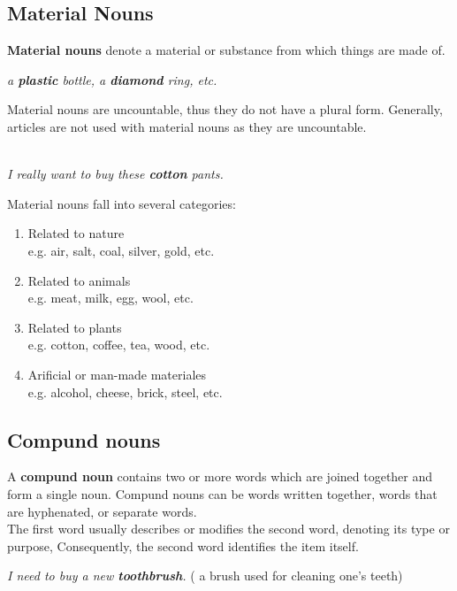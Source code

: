 \documentclass[hidelinks,10pt,a4paper]{article}
\begin{document}
\subsection{Material Nouns}
\textbf{Material nouns} denote a material or substance from which things are made of.
\begin{center}
		\textit{		a \textbf{plastic} bottle, a \textbf{diamond} ring, etc.}
\end{center}
Material nouns are uncountable, thus they do not have a plural form. Generally, articles are not used with material nouns as they are uncountable.
\begin{center}
\textit{
		\\
I really want to buy these \textbf{cotton} pants.}
\end{center}

\newpage
Material nouns fall into several categories:
\begin{center}
		\begin{enumerate}[label=\alph*)]
		\item Related to nature\\
				e.g. air, salt, coal, silver, gold, etc.
		\item Related to animals\\
				e.g. meat, milk, egg, wool, etc.
		\item Related to plants\\
				e.g. cotton, coffee, tea, wood, etc.
		\item Arificial or man-made materiales\\
				e.g. alcohol, cheese, brick, steel, etc.
		\end{enumerate}
\end{center}

\subsection{Compund nouns}
A \textbf{compund noun} contains two or more words which are joined together and form a single noun. Compund nouns can be words written together, words that are hyphenated, or separate words.\\
The first word usually describes or modifies the second word, denoting its type or purpose, Consequently, the second word identifies the item itself.
\begin{center}
\textit{
I need to buy a new \textbf{toothbrush}.} ( a brush used for cleaning one's teeth)
\end{center}
\end{document}
